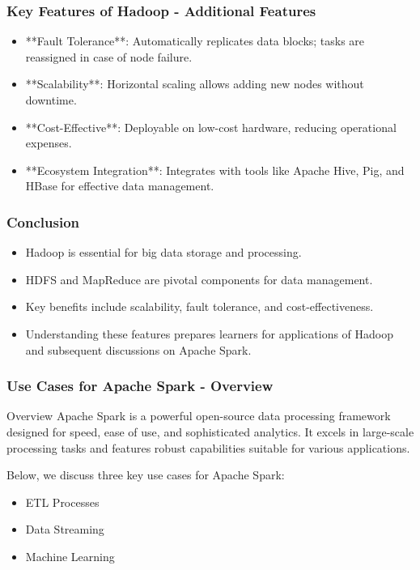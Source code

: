 \documentclass{beamer}
\begin{document}
\begin{frame}
    \frametitle{Key Features of Hadoop - Additional Features}
    \begin{itemize}
        \item **Fault Tolerance**: Automatically replicates data blocks; tasks are reassigned in case of node failure.
        \item **Scalability**: Horizontal scaling allows adding new nodes without downtime.
        \item **Cost-Effective**: Deployable on low-cost hardware, reducing operational expenses.
        \item **Ecosystem Integration**: Integrates with tools like Apache Hive, Pig, and HBase for effective data management.
    \end{itemize}
\end{frame}

\begin{frame}
    \frametitle{Conclusion}
    \begin{itemize}
        \item Hadoop is essential for big data storage and processing.
        \item HDFS and MapReduce are pivotal components for data management.
        \item Key benefits include scalability, fault tolerance, and cost-effectiveness.
        \item Understanding these features prepares learners for applications of Hadoop and subsequent discussions on Apache Spark.
    \end{itemize}
\end{frame}

\begin{frame}[fragile]
    \frametitle{Use Cases for Apache Spark - Overview}
    \begin{block}{Overview}
        Apache Spark is a powerful open-source data processing framework designed for speed, ease of use, and sophisticated analytics. It excels in large-scale processing tasks and features robust capabilities suitable for various applications.
    \end{block}
    Below, we discuss three key use cases for Apache Spark:
    \begin{itemize}
        \item ETL Processes
        \item Data Streaming
        \item Machine Learning
    \end{itemize}
\end{frame}
\end{document}
